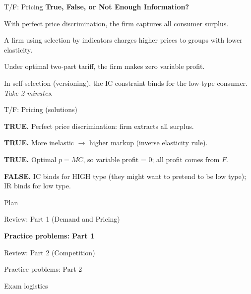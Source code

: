 \documentclass[notes,11pt, aspectratio=169]{beamer}
\newenvironment{wideenumerate}{\enumerate\addtolength{\itemsep}{10pt}}{\endenumerate}
\begin{document}
\begin{frame}{T/F: Pricing}
	\textbf{True, False, or Not Enough Information?}
	\vspace{8pt}
	\begin{wideenumerate}
		\item With perfect price discrimination, the firm captures all consumer surplus.
		\item A firm using selection by indicators charges higher prices to groups with lower elasticity.
		\item Under optimal two-part tariff, the firm makes zero variable profit.
		\item In self-selection (versioning), the IC constraint binds for the low-type consumer.
	\end{wideenumerate}
	\vspace{8pt}
	\centering
	\textit{Take 2 minutes.}
\end{frame}

\begin{frame}{T/F: Pricing (solutions)}
	\begin{wideenumerate}
		\item \textbf{TRUE.} Perfect price discrimination: firm extracts all surplus.
		\item \textbf{TRUE.} More inelastic $\rightarrow$ higher markup (inverse elasticity rule).
		\item \textbf{TRUE.} Optimal $p = MC$, so variable profit = 0; all profit comes from $F$.
		\item \textbf{FALSE.} IC binds for HIGH type (they might want to pretend to be low type); IR binds for low type.
	\end{wideenumerate}
\end{frame}

\begin{frame}{Plan}
  \begin{wideenumerate}
    \item Review: Part 1 (Demand and Pricing)
    \item \textbf{Practice problems: Part 1}
    \item Review: Part 2 (Competition)
    \item Practice problems: Part 2
    \item Exam logistics
  \end{wideenumerate}
\end{frame}
\end{document}
